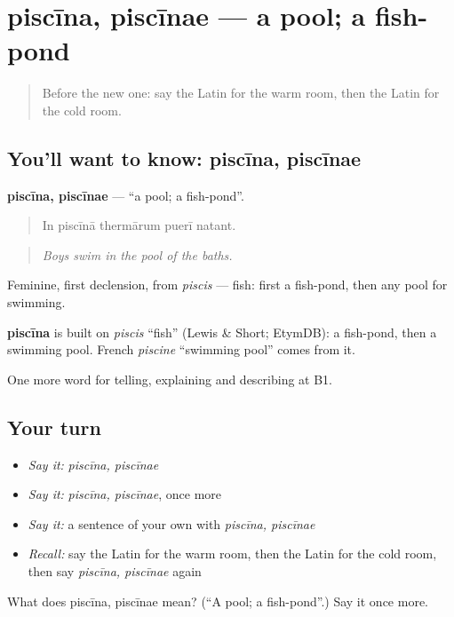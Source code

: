 \section[piscīna, piscīnae]{piscīna, piscīnae — a pool; a fish-pond}

\label{lesson:LA-C541-piscina}



\begin{quote}
Before the new one: say the Latin for the warm room, then the Latin for the cold room.
\end{quote}

\subsection*{You'll want to know: piscīna, piscīnae}
\textbf{piscīna, piscīnae} — \textquotedblleft{}a pool; a fish-pond\textquotedblright{}.

\begin{quote}
In piscīnā thermārum puerī natant.
\end{quote}

\begin{quote}
\emph{Boys swim in the pool of the baths.}
\end{quote}

Feminine, first declension, from \emph{piscis} — fish: first a fish-pond, then any pool for swimming.

\begin{cousinweb}
\textbf{piscīna} is built on \emph{piscis} \textquotedblleft{}fish\textquotedblright{} (Lewis \& Short; EtymDB): a fish-pond, then a swimming pool. French \emph{piscine} \textquotedblleft{}swimming pool\textquotedblright{} comes from it.
\end{cousinweb}

\begin{grammarlens}[title={What you've built}]
One more word for telling, explaining and describing at B1.
\end{grammarlens}

\subsection*{Your turn}
\begin{itemize}
\raggedright
  \item \emph{Say it:} \emph{piscīna, piscīnae}
  \item \emph{Say it:} \emph{piscīna, piscīnae}, once more
  \item \emph{Say it:} a sentence of your own with \emph{piscīna, piscīnae}
  \item \emph{Recall:} say the Latin for the warm room, then the Latin for the cold room, then say \emph{piscīna, piscīnae} again
\end{itemize}

\begin{tcolorbox}[breakable,colback=teal!4,colframe=teal!35!black,title={Before you move on}]
What does piscīna, piscīnae mean? (\textquotedblleft{}A pool; a fish-pond\textquotedblright{}.) Say it once more.
\end{tcolorbox}
